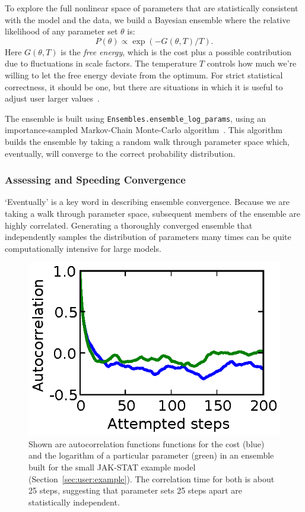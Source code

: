 \documentclass[12pt]{article}
\makeatletter
\newcommand{\py}[1]{\lstinline[language=Python, showstringspaces=False]@#1@}
\makeatother
\begin{document}
To explore the full nonlinear space of parameters that are statistically consistent with the model and the data, we build a Bayesian ensemble where the relative likelihood of any parameter set $\theta$ is:
\begin{equation}
P(\theta) \propto \exp\left(-G(\theta, T)/T\right).
\end{equation}
Here $G(\theta, T)$ is the \emph{free energy}, which is the cost plus a possible contribution due to fluctuations in scale factors.
The temperature $T$ controls how much we're willing to let the free energy deviate from the optimum.
For strict statistical correctness, it should be one, but there are situations in which it is useful to adjust user larger values~\cite{bib:Frederiksen2004}.

The ensemble is built using \py{Ensembles.ensemble_log_params}, using an importance-sampled Markov-Chain Monte-Carlo algorithm~\cite{bib:Chib1995}.
This algorithm builds the ensemble by taking a random walk through parameter space which, eventually, will converge to the correct probability distribution.

\subsubsection{Assessing and Speeding Convergence}

`Eventually' is a key word in describing ensemble convergence.
Because we are taking a walk through parameter space, subsequent members of the ensemble are highly correlated.
Generating a thoroughly converged ensemble that independently samples the distribution of parameters many times can be quite computationally intensive for large models.

\begin{figure}
\begin{center}
\includegraphics{autocorr}
\end{center}
\caption[Example autocorrelation functions]{Shown are autocorrelation functions functions for the cost (blue) and the logarithm of a particular parameter (green) in an ensemble built for the small JAK-STAT example model (Section~\ref{sec:user:example}). The correlation time for both is about 25 steps, suggesting that parameter sets 25 steps apart are statistically independent.\label{fig:user:autocorr}}
\end{figure}
\end{document}
